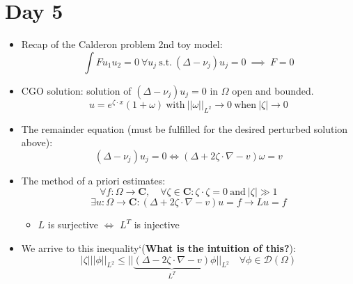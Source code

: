 \documentclass{article}
\begin{document}
\section*{Day 5}
\begin{itemize}
    \item Recap of the Calderon problem 2nd toy model:
    \begin{equation}
        \int F u_1 u_2 = 0 \ \forall u_j \ \text{s.t.} \ (\Delta - \nu_j) u_j = 0 \ \implies \ F=0
    \end{equation}

    \item CGO solution: solution of $(\Delta - \nu_j) u_j = 0$ in $\Omega$ open and bounded.
    \begin{equation}
        u = e^{\zeta \cdot x}(1+\omega) \ \text{with} \ ||\omega||_{L^2} \rightarrow 0 \ \text{when} \ |\zeta| \rightarrow 0
    \end{equation}

    \item The remainder equation (must be fulfilled for the desired perturbed solution above):
    \begin{equation}
        (\Delta - \nu_j) u_j = 0 \iff (\Delta + 2\zeta \cdot \nabla - v) \omega = v
    \end{equation}

    \item The method of a priori estimates:
    \begin{equation}
        \forall f: \Omega \rightarrow \mathbf{C}, \quad \forall \zeta \in \mathbf{C}: \zeta \cdot \zeta = 0 \ \text{and} \ |\zeta| \gg 1
    \end{equation}
    \begin{equation}
        \exists u:\Omega \rightarrow \mathbf{C}: (\Delta + 2\zeta \cdot \nabla - v) u = f \rightarrow Lu = f
    \end{equation}
    \begin{itemize}
        \item $L$ is surjective $\iff$ $L^T$ is injective
    \end{itemize}

    \item We arrive to this inequality`(\textbf{What is the intuition of this?}):
    \begin{equation}
        |\zeta|||\phi||_{L^2} \leq ||\underbrace{(\Delta - 2\zeta \cdot \nabla - v)}_{L^T} \phi||_{L^2} \quad \forall \phi \in \mathcal{D}(\Omega)
    \end{equation}


\end{itemize}
\end{document}
